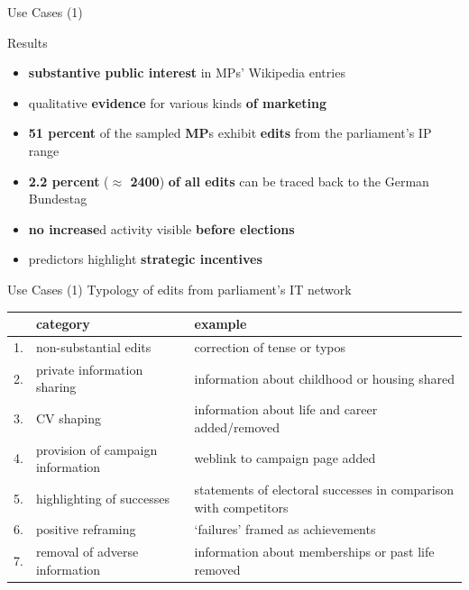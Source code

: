 \begin{frame}{Use Cases (1)}
\begin{block}{Results}
\begin{itemize}
	\item \textbf{substantive public interest} in MPs' Wikipedia entries
	\item qualitative \textbf{evidence} for various kinds \textbf{of marketing}
	\item \textbf{51 percent} of the sampled \textbf{MP}s exhibit \textbf{edits} from the parliament's IP range
	\item \textbf{2.2 percent} (\textbf{$\approx$ 2400}) \textbf{of all edits} can be traced back to the German Bundestag
	\item \textbf{no increase}d activity visible \textbf{before elections}
	\item predictors highlight \textbf{strategic incentives}
\end{itemize}
\end{block}
\end{frame}

\begin{frame}{Use Cases (1)}
\vspace{0.2cm}
Typology of edits from parliament's IT network
\vspace{-0.2cm}
\small
\begin{table}
\begin{tabularx}{\linewidth}{lXX}
  \toprule
& category & example  \\ 
 \midrule
1. & non-substantial edits & correction of tense or typos \\
2. & private information sharing & information about childhood or housing shared \\
3. & CV shaping & information about life and career added/removed    \\
4. & provision of campaign information  & weblink to campaign page added \\
5. & highlighting of successes  & statements of electoral successes in comparison with competitors \\
6. & positive reframing  & `failures' framed as achievements \\
7. & removal of adverse information  & information about memberships or past life removed \\
  \bottomrule
\end{tabularx}
\end{table}
\end{frame}

